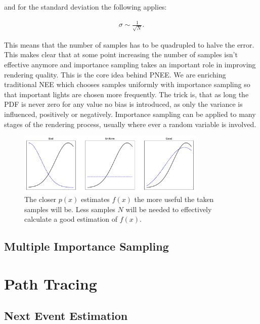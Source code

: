 and for the standard deviation the following applies:

\begin{align}
 \sigma \sim \frac{1}{\sqrt{N}}.
\end{align}

This means that the number of samples has to be quadrupled to halve the error. This makes clear that at some point increasing the number of samples isn't effective anymore and importance sampling takes an important role in improving rendering quality. This is the core idea behind PNEE. We are enriching traditional NEE which chooses samples uniformly with importance sampling so that important lights are chosen more frequently. The trick is, that as long the PDF is never zero for any value no bias is introduced, as only the variance is influenced, positively or negatively. Importance sampling can be applied to many stages of the rendering process, usually where ever a random variable is involved. 


\begin{figure}
    \centering
    \includegraphics[width=0.8\textwidth]{figures/plots/importancesampling.pdf}
    \caption{The closer $p(x)$ estimates $f(x)$ the more useful the taken samples will be. Less samples $N$ will be needed to effectively calculate a good estimation of $f(x)$.   }
    \label{fig:importancesample}
\end{figure}

\subsection{Multiple Importance Sampling}

\section{Path Tracing}
\subsection{Next Event Estimation}
\label{sec:NEE}







